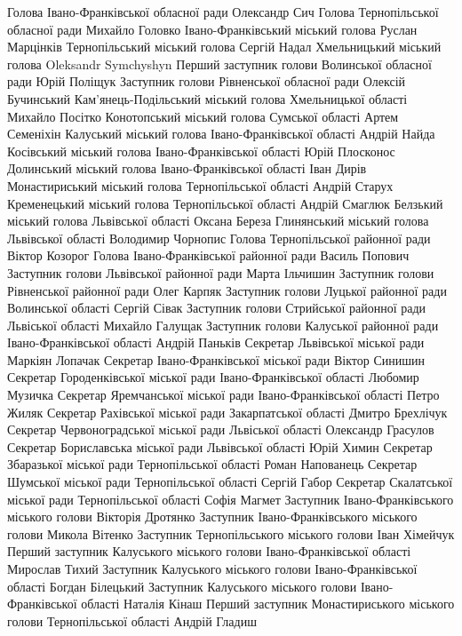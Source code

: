 \obeycr
Голова Івано-Франківської обласної ради Олександр Сич
Голова Тернопільської обласної ради Михайло Головко
Івано-Франківський міський голова Руслан Марцінків
Тернопільський міський голова Сергій Надал
Хмельницький міський голова Oleksandr Symchyshyn
Перший заступник голови Волинської обласної ради Юрій Поліщук
Заступник голови Рівненської обласної ради Олексій Бучинський
Кам’янець-Подільський міський голова Хмельницької області Михайло Посітко 
Конотопський міський голова Сумської області Артем Семеніхін 
Калуський міський голова Івано-Франківської області Андрій Найда
Косівський міський голова Івано-Франківської області Юрій Плосконос
Долинський міський голова Івано-Франківської області Іван Дирів
Монастириський міський голова Тернопільської області Андрій Старух
Кременецький міський голова Тернопільської області Андрій Смаглюк
Белзький міський голова Львівської області Оксана Береза
Глинянський міський голова Львівської області Володимир Чорнопис
Голова Тернопільської районної ради Віктор Козорог
Голова Івано-Франківської районної ради Василь Попович
Заступник голови Львівської районної ради Марта Ільчишин
Заступник голови Рівненської районної ради Олег Карпяк  
Заступник голови Луцької районної ради Волинської області Сергій Сівак
Заступник голови Стрийської районної ради Львіської області Михайло Галущак
Заступник голови Калуської районної ради Івано-Франківської області Андрій Паньків
Секретар Львівської міської ради Маркіян Лопачак
Секретар Івано-Франківської міської ради Віктор Синишин
Секретар Городенківської міської ради Івано-Франківської області Любомир Музичка 
Секретар Яремчанської міської ради Івано-Франківської області Петро Жиляк
Секретар Рахівської міської ради Закарпатської області Дмитро Брехлічук 
Секретар Червоноградської мiської ради Львіської області Олександр Грасулов
Секретар Бориславська міської ради Львівської області Юрій Химин
Секретар Збаразької міської ради Тернопільської області Роман Напованець
Секретар Шумської міської ради Тернопільської області Сергій Габор
Секретар Скалатської міської ради Тернопільської області Софія Магмет
Заступник Івано-Франківського міського голови Вікторія Дротянко
Заступник Івано-Франківського міського голови Микола Вітенко
Заступник Тернопільського міського голови Іван Хімейчук
Перший заступник Калуського міського голови Івано-Франківської області Мирослав Тихий
Заступник Калуського міського голови Івано-Франківської області Богдан Білецький 
Заступник Калуського міського голови Івано-Франківської області Наталія Кінаш
Перший заступник Монастириського міського голови Тернопільської області Андрій Гладиш
